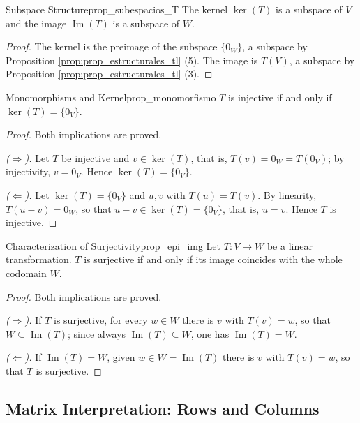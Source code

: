 \documentclass[11pt, a4paper]{article}
\begin{document}
\begin{proposicion}{Subspace Structure}{prop_subespacios_T}
The kernel $\ker(T)$ is a subspace of $V$ and the image $\operatorname{Im}(T)$ is a subspace of $W$.
\end{proposicion}

\begin{proof}
The kernel is the preimage of the subspace $\{0_W\}$, a subspace by Proposition \ref{prop:prop_estructurales_tl} (5). The image is $T(V)$, a subspace by Proposition \ref{prop:prop_estructurales_tl} (3).
\end{proof}

\begin{proposicion}{Monomorphisms and Kernel}{prop_monomorfismo}
$T$ is injective if and only if $\ker(T) = \{0_V\}$.
\end{proposicion}

\begin{proof}
Both implications are proved.

\textit{($\Rightarrow$).} Let $T$ be injective and $v \in \ker(T)$, that is, $T(v) = 0_W = T(0_V)$; by injectivity, $v = 0_V$. Hence $\ker(T) = \{0_V\}$.

\textit{($\Leftarrow$).} Let $\ker(T) = \{0_V\}$ and $u, v$ with $T(u) = T(v)$. By linearity, $T(u - v) = 0_W$, so that $u - v \in \ker(T) = \{0_V\}$, that is, $u = v$. Hence $T$ is injective.
\end{proof}

\begin{proposicion}{Characterization of Surjectivity}{prop_epi_img}
Let $T: V \to W$ be a linear transformation.
$T$ is surjective if and only if its image coincides with the whole codomain $W$.
\end{proposicion}

\begin{proof}
Both implications are proved.

\textit{($\Rightarrow$).} If $T$ is surjective, for every $w \in W$ there is $v$ with $T(v) = w$, so that $W \subseteq \operatorname{Im}(T)$; since always $\operatorname{Im}(T) \subseteq W$, one has $\operatorname{Im}(T) = W$.

\textit{($\Leftarrow$).} If $\operatorname{Im}(T) = W$, given $w \in W = \operatorname{Im}(T)$ there is $v$ with $T(v) = w$, so that $T$ is surjective.
\end{proof}

\subsection{Matrix Interpretation: Rows and Columns}
\end{document}
